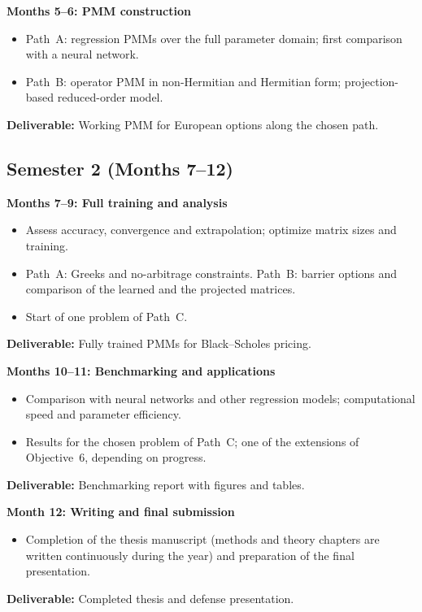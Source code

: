 \documentclass[12pt,a4paper]{article}
\begin{document}
\bigskip

\textbf{Months 5--6: PMM construction}
\begin{itemize}
    \item Path~A: regression PMMs over the full parameter domain;
    first comparison with a neural network.
    \item Path~B: operator PMM in non-Hermitian and Hermitian form;
    projection-based reduced-order model.
\end{itemize}
\textbf{Deliverable:} Working PMM for European options along the
chosen path.

\subsection*{Semester 2 (Months 7--12)}

\textbf{Months 7--9: Full training and analysis}
\begin{itemize}
    \item Assess accuracy, convergence and extrapolation; optimize
    matrix sizes and training.
    \item Path~A: Greeks and no-arbitrage constraints.  Path~B:
    barrier options and comparison of the learned and the projected
    matrices.
    \item Start of one problem of Path~C.
\end{itemize}
\textbf{Deliverable:} Fully trained PMMs for Black--Scholes pricing.

\bigskip

\textbf{Months 10--11: Benchmarking and applications}
\begin{itemize}
    \item Comparison with neural networks and other regression
    models; computational speed and parameter efficiency.
    \item Results for the chosen problem of Path~C; one of the
    extensions of Objective~6, depending on progress.
\end{itemize}
\textbf{Deliverable:} Benchmarking report with figures and tables.

\bigskip

\textbf{Month 12: Writing and final submission}
\begin{itemize}
    \item Completion of the thesis manuscript (methods and theory
    chapters are written continuously during the year) and
    preparation of the final presentation.
\end{itemize}
\textbf{Deliverable:} Completed thesis and defense presentation.
\end{document}
